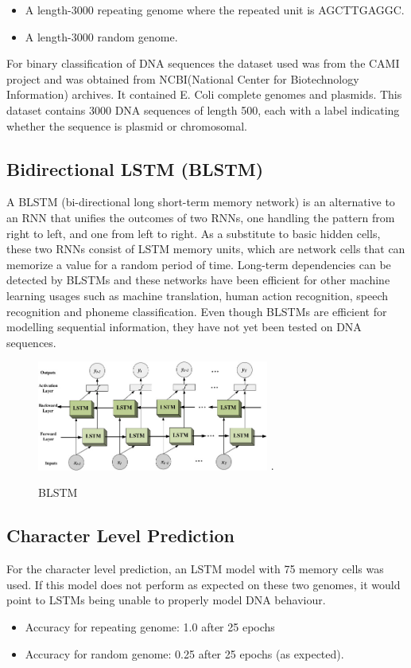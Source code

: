 \documentclass[conference]{IEEEtran}
\begin{document}
\begin{itemize}
    \item A length-3000 repeating genome where the repeated unit is AGCTTGAGGC.
    \item A length-3000 random genome.
\end{itemize}
\newline
For binary classification of DNA sequences the dataset used was from the CAMI project and was obtained from NCBI(National Center for Biotechnology Information) archives. It contained E. Coli complete genomes and plasmids. This dataset contains 3000 DNA sequences of length 500, each with a label indicating whether the sequence is plasmid or chromosomal. 

\subsection{Bidirectional LSTM (BLSTM)}
A BLSTM (bi-directional long short-term memory network) is an alternative to an RNN that unifies the outcomes of two RNNs, one handling the pattern from right to left, and one from left to right. As a substitute to basic hidden cells, these two RNNs consist of LSTM memory units, which are network cells that can memorize a value for a random period of time. Long-term dependencies can be detected by BLSTMs and these networks have been efficient for other machine learning usages such as machine translation, human action recognition, speech recognition and phoneme classification. Even though BLSTMs are efficient for modelling sequential information, they have not yet been tested on DNA sequences. \cite{bidirprotein}

\begin{figure}[h]
\centering
\includegraphics[width=3in]{bidir.jpg}
\DeclareGraphicsExtensions.
\caption{BLSTM}
\label{fig_sim}
\end{figure}

\subsection{Character Level Prediction}
For the character level prediction, an LSTM model with 75 memory cells was used. If this model does not perform as expected on these two genomes, it would point to LSTMs being unable to properly model DNA behaviour\cite{shortrnn}.
\begin{itemize}
    \item Accuracy for repeating genome: 1.0 after 25 epochs
     \item Accuracy for random genome: 0.25 after 25 epochs
(as expected).
\end{itemize}
\end{document}
